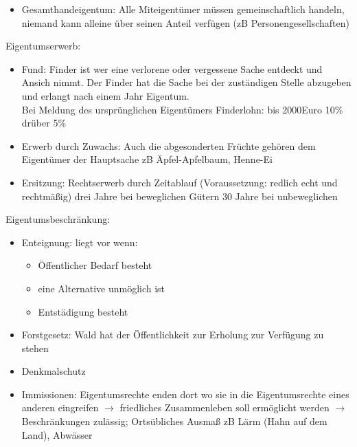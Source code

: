 \documentclass[a4paper]{report}
\begin{document}
\begin{itemize}
\begin{itemize}
\item Gesamthandeigentum: Alle Miteigentümer müssen gemeinschaftlich handeln, niemand kann alleine über seinen Anteil verfügen (zB Personengesellschaften)
\end{itemize}
Eigentumserwerb:
\begin{itemize}
\item Fund: Finder ist wer eine verlorene oder vergessene Sache entdeckt und Ansich nimmt. Der Finder hat die Sache bei der zuständigen Stelle abzugeben und erlangt nach einem Jahr Eigentum. \\
Bei Meldung des ursprünglichen Eigentümers  Finderlohn: bis 2000Euro 10\% drüber 5\%
\item Erwerb durch Zuwachs: Auch die abgesonderten Früchte gehören dem Eigentümer der Hauptsache zB Äpfel-Apfelbaum, Henne-Ei
\item Ersitzung: Rechtserwerb durch Zeitablauf (Voraussetzung: redlich echt und rechtmäßig) drei Jahre bei beweglichen Gütern 30 Jahre bei unbeweglichen 
\end{itemize}
Eigentumsbeschränkung:
\begin{itemize}
\item Enteignung: liegt vor wenn:
\begin{itemize}
\item Öffentlicher Bedarf besteht
\item eine Alternative unmöglich ist
\item Entstädigung besteht
\end{itemize}
\item Forstgesetz: Wald hat der Öffentlichkeit zur Erholung zur Verfügung zu stehen 
\item Denkmalschutz
\item Immissionen: Eigentumsrechte enden dort wo sie in die Eigentumsrechte eines anderen eingreifen $\rightarrow$ friedliches Zusammenleben soll ermöglicht werden $\rightarrow$ Beschränkungen zulässig; Ortsübliches Ausmaß zB Lärm (Hahn auf dem Land), Abwässer
\end{itemize}
\end{itemize}
\end{document}
